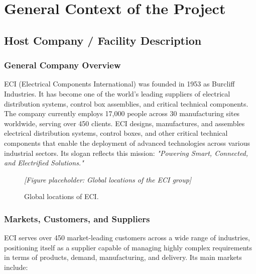 \chapter{General Context of the Project}
\label{ch:context}


\section{Host Company / Facility Description}
\label{sec:company}

\subsection{General Company Overview}

ECI (Electrical Components International) was founded in 1953 as Burcliff Industries. It has become one of the world's leading suppliers of electrical distribution systems, control box assemblies, and critical technical components. The company currently employs 17,000 people across 30 manufacturing sites worldwide, serving over 450 clients. ECI designs, manufactures, and assembles electrical distribution systems, control boxes, and other critical technical components that enable the deployment of advanced technologies across various industrial sectors. Its slogan reflects this mission: \textit{"Powering Smart, Connected, and Electrified Solutions."}

\begin{figure}[H]
  \centering
  \textit{[Figure placeholder: Global locations of the ECI group]}
  \caption{Global locations of ECI.}
  \label{fig:eci-global}
\end{figure}

\subsection{Markets, Customers, and Suppliers}

ECI serves over 450 market-leading customers across a wide range of industries, positioning itself as a supplier capable of managing highly complex requirements in terms of products, demand, manufacturing, and delivery. Its main markets include:


